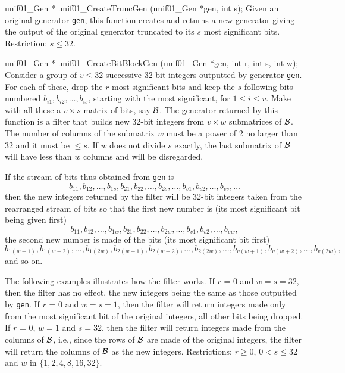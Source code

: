 unif01_Gen * unif01_CreateTruncGen (unif01_Gen *gen, int s);
\endcode
 \tab   Given an original generator {\tt gen}, this function
% 
  creates and returns a new generator giving the output of the
  original generator truncated to its $s$ most significant bits.
 Restriction: $s \le 32$.
\endtab
\code


unif01_Gen * unif01_CreateBitBlockGen (unif01_Gen *gen, int r, int s,
                                       int w);
\endcode
 \tab  Consider a group of $v \le 32$ successive 32-bit integers
  outputted by generator {\tt gen}. For each of these, drop the $r$ most
% 
  significant bits and keep the $s$ following bits numbered
  $b_{i 1}, b_{i 2}, \ldots, b_{i s}$, starting with the
  most significant, for $1 \le i \le v$.
  Make with all these a $v\times s$ matrix of bits, say ${\cal B}$.
  The generator returned by this function is a filter that builds new 32-bit
   integers from $v\times w$ submatrices of ${\cal B}$. 
  The number of columns of the submatrix $w$ must be a power of 2 no larger
  than 32 and it must be $\le s$. If $w$ does not divide $s$ exactly,
  the last submatrix of ${\cal B}$ will have less than $w$ columns and
  will be disregarded.

  If the stream of bits thus obtained from {\tt gen} is
  $$
   b_{1 1}, b_{1 2}, \ldots,  b_{1 s},
   b_{2 1}, b_{2 2}, \ldots,  b_{2 s},
   \ldots,
   b_{v 1}, b_{v 2}, \ldots,  b_{v s}, \ldots
$$
   then the new integers returned by the filter will be 32-bit integers
   taken from the rearranged stream of bits so that the first new 
   number is (its most significant bit being given first)
  $$
   b_{1 1}, b_{1 2}, \ldots,  b_{1 w},
   b_{2 1}, b_{2 2}, \ldots,  b_{2 w},
   \ldots,
   b_{v 1}, b_{v 2}, \ldots,  b_{v w},
$$
  the second new  number is made of the bits (its most
  significant bit first)
  $$
   b_{1 (w+1)}, b_{1 (w+2)}, \ldots,  b_{1 (2w)},
   b_{2 (w+1)}, b_{2 (w+2)}, \ldots,  b_{2 (2w)},
   \ldots,
   b_{v (w+1)}, b_{v (w+2)}, \ldots,  b_{v (2w)},
  $$
  and so on.

  The following examples illustrates how the filter works.
  If $r$ = 0 and $w = s = 32$, then the filter has no effect,
  the new integers being the same as those outputted by  {\tt gen}.
  If $r$ = 0 and $w = s = 1$, then the filter will return integers
  made only from the most significant bit of the original integers, all 
  other bits being dropped.
  If $r$ = 0, $w = 1$ and $ s = 32$, then the filter will return integers
  made from the columns of ${\cal B}$, i.e., since the rows of ${\cal B}$
  are made of the original integers, the filter will return the columns
  of ${\cal B}$ as the new integers. 
  Restrictions: $r \ge 0$, $0 < s \le 32$ and
   $w$ in  $\{1, 2, 4, 8, 16, 32\}$.
 \endtab
\code


